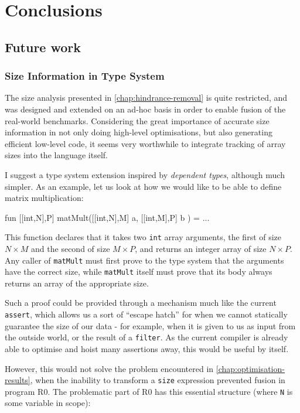 \chapter{Conclusions}
\label{chap:conclusions}

\section{Future work}
\label{sec:future-work}

\subsection{Size Information in Type System}

The size analysis presented in \cref{chap:hindrance-removal} is quite
restricted, and was designed and extended on an ad-hoc basis in order
to enable fusion of the real-world benchmarks.  Considering the great
importance of accurate size information in not only doing high-level
optimisations, but also generating efficient low-level code, it seems
very worthwhile to integrate tracking of array sizes into the language
itself.

I suggest a type system extension inspired by \textit{dependent
  types}, although much simpler.  As an example, let us look at how we
would like to be able to define matrix multiplication:

\begin{colorcode}
fun [[int,N],P] matMult([[int,N],M] a, [[int,M],P] b ) =
  ...
\end{colorcode}

This function declares that it takes two \texttt{int} array arguments,
the first of size $N \times M$ and the second of size $M \times P$,
and returns an integer array of size $N \times P$.  Any caller of
\texttt{matMult} must first prove to the type system that the
arguments have the correct size, while \texttt{matMult} itself must
prove that its body always returns an array of the appropriate size.

Such a proof could be provided through a mechanism much like the
current \texttt{assert}, which allows us a sort of ``escape hatch''
for when we cannot statically guarantee the size of our data - for
example, when it is given to us as input from the outside world, or
the result of a \texttt{filter}.  As the current \LO{} compiler is
already able to optimise and hoist many assertions away, this would be
useful by itself.

However, this would not solve the problem encountered in
\cref{chap:optimisation-results}, when the inability to transform a
\texttt{size} expression prevented fusion in program R0.  The
problematic part of R0 has this essential structure (where \texttt{N}
is some variable in scope):

